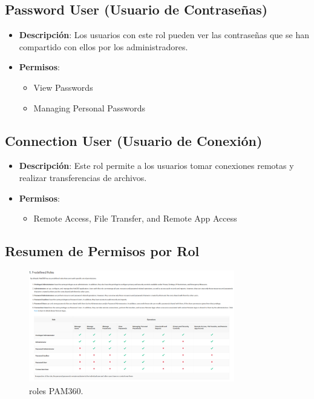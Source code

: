 \subsection{Password User (Usuario de Contraseñas)}
\begin{itemize}
	\item \textbf{Descripción}: Los usuarios con este rol pueden ver las contraseñas que se han compartido con ellos por los administradores.
	\item \textbf{Permisos}:
	\begin{itemize}
		\item View Passwords
		\item Managing Personal Passwords
	\end{itemize}
\end{itemize}

\subsection{Connection User (Usuario de Conexión)}
\begin{itemize}
	\item \textbf{Descripción}: Este rol permite a los usuarios tomar conexiones remotas y realizar transferencias de archivos.
	\item \textbf{Permisos}:
	\begin{itemize}
		\item Remote Access, File Transfer, and Remote App Access
	\end{itemize}
\end{itemize}

\subsection{Resumen de Permisos por Rol}

\begin{figure}[H]
	\centering
	\includegraphics[width=0.8\textwidth]{./img/pam_roles.png}
	\caption{roles PAM360.}
	\label{fig:pam_rol}
\end{figure}


